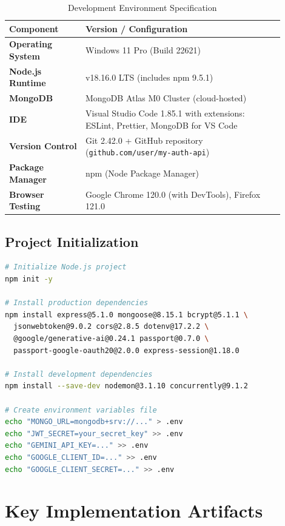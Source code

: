 \begin{table}[H]
\centering
\caption{Development Environment Specification}
\label{tab:dev_env}
\begin{tabular}{@{}p{0.25\linewidth}p{0.65\linewidth}@{}}
\toprule
\textbf{Component} & \textbf{Version / Configuration} \\
\midrule
\textbf{Operating System} & Windows 11 Pro (Build 22621) \\
\textbf{Node.js Runtime} & v18.16.0 LTS (includes npm 9.5.1) \\
\textbf{MongoDB} & MongoDB Atlas M0 Cluster (cloud-hosted) \\
\textbf{IDE} & Visual Studio Code 1.85.1 with extensions: ESLint, Prettier, MongoDB for VS Code \\
\textbf{Version Control} & Git 2.42.0 + GitHub repository (\texttt{github.com/user/my-auth-api}) \\
\textbf{Package Manager} & npm (Node Package Manager) \\
\textbf{Browser Testing} & Google Chrome 120.0 (with DevTools), Firefox 121.0 \\
\bottomrule
\end{tabular}
\end{table}

\subsection{Project Initialization}

\begin{lstlisting}[language=bash, caption=Project Setup Commands]
# Initialize Node.js project
npm init -y

# Install production dependencies
npm install express@5.1.0 mongoose@8.15.1 bcrypt@5.1.1 \
  jsonwebtoken@9.0.2 cors@2.8.5 dotenv@17.2.2 \
  @google/generative-ai@0.24.1 passport@0.7.0 \
  passport-google-oauth20@2.0.0 express-session@1.18.0

# Install development dependencies
npm install --save-dev nodemon@3.1.10 concurrently@9.1.2

# Create environment variables file
echo "MONGO_URL=mongodb+srv://..." > .env
echo "JWT_SECRET=your_secret_key" >> .env
echo "GEMINI_API_KEY=..." >> .env
echo "GOOGLE_CLIENT_ID=..." >> .env
echo "GOOGLE_CLIENT_SECRET=..." >> .env
\end{lstlisting}

\section{Key Implementation Artifacts}

